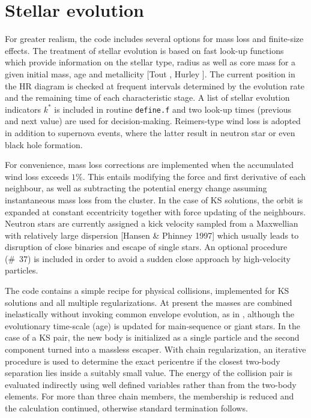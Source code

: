 \documentclass[12pt]{article}
\begin{document}
\section{Stellar evolution}

For greater realism, the code includes several options for mass loss and
finite-size effects.
The treatment of stellar evolution is based on fast look-up functions
which provide information on the stellar type, radius as well as core mass
for a given initial mass, age and metallicity [Tout ,
Hurley ].
The current position in the HR diagram is checked at frequent intervals
determined by the evolution rate and the remaining time of each
characteristic stage.
A list of stellar evolution indicators $k^{\ast}$ is included in routine
{\tt define.f} and two look-up times (\ie previous and next value) are used
for decision-making.
Reimers-type wind loss is adopted in addition to supernova events, where the
latter result in neutron star or even black hole formation.

For convenience, mass loss corrections are implemented when the accumulated
wind loss exceeds $1\%$.
This entails modifying the force and first derivative of each neighbour, as
well as subtracting the potential energy change assuming instantaneous mass
loss from the cluster.
In the case of KS solutions, the orbit is expanded at constant eccentricity
together with force updating of the \cm neighbours.
Neutron stars are currently assigned a kick velocity sampled from a
Maxwellian with relatively large dispersion [\cf Hansen \& Phinney 1997]
which usually leads to disruption of close binaries and escape of single
stars.
An optional procedure (\#~37) is included in order to avoid a sudden close
approach by high-velocity particles.

The code contains a simple recipe for physical collisions, implemented for
KS solutions and all multiple regularizations.
At present the masses are combined inelastically without invoking common
envelope evolution, as in {}, although the evolutionary
time-scale (\ie age) is updated for main-sequence or giant stars.
In the case of a KS pair, the new \cm body is initialized as a
single particle and the second component turned into a massless escaper.
With chain regularization, an iterative procedure is used to determine the
exact pericentre if the closest two-body separation lies inside a suitably
small value.
The energy of the collision pair is evaluated indirectly using well defined
variables rather than from the two-body elements.
For more than three chain members, the membership is reduced and the
calculation continued, otherwise standard termination follows.
\end{document}
